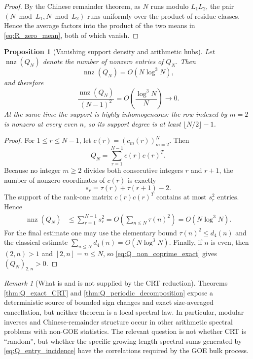 \documentclass[11pt]{amsart}
\numberwithin{equation}{section}
\theoremstyle{plain}
\newtheorem{proposition}[theorem]{Proposition}
\theoremstyle{definition}
\theoremstyle{remark}
\newtheorem{remark}[theorem]{Remark}
\begin{document}
\begin{proof}
By the Chinese remainder theorem, as $N$ runs modulo $L_1L_2$, the pair $(N\bmod L_1,N\bmod L_2)$ runs uniformly over the product of residue classes.  Hence the average factors into the product of the two means in \eqref{eq:R_zero_mean}, both of which vanish.
\end{proof}

\begin{proposition}[Vanishing support density and arithmetic hubs]
\label{prop:Q_sparsity}
Let $\operatorname{nnz}(Q_N)$ denote the number of nonzero entries of $Q_N$.  Then
\begin{equation}
\operatorname{nnz}(Q_N)=O(N\log^3N),
\label{eq:Q_nnz_bound}
\end{equation}
and therefore
\begin{equation}
\frac{\operatorname{nnz}(Q_N)}{(N-1)^2}
=O\!\left(\frac{\log^3N}{N}\right)\longrightarrow0.
\label{eq:Q_support_density_zero}
\end{equation}
At the same time the support is highly inhomogeneous: the row indexed by $m=2$ is nonzero at every even $n$, so its support degree is at least $\lfloor N/2\rfloor-1$.
\end{proposition}

\begin{proof}
For $1\le r\le N-1$, let $c(r)=(c_m(r))_{m=2}^N$.  Then
\begin{equation}
Q_N=\sum_{r=1}^{N-1}c(r)c(r)^T.
\label{eq:Q_rank_one_sum}
\end{equation}
Because no integer $m\ge2$ divides both consecutive integers $r$ and $r+1$, the number of nonzero coordinates of $c(r)$ is exactly
\begin{equation}
s_r=\tau(r)+\tau(r+1)-2.
\end{equation}
The support of the rank-one matrix $c(r)c(r)^T$ contains at most $s_r^2$ entries.  Hence
\begin{align}
\operatorname{nnz}(Q_N)
&\le\sum_{r=1}^{N-1}s_r^2
=O\!\left(\sum_{n\le N}\tau(n)^2\right)
=O(N\log^3N).
\end{align}
For the final estimate one may use the elementary bound $\tau(n)^2\le d_4(n)$ and the classical estimate $\sum_{n\le N}d_4(n)=O(N\log^3N)$.  Finally, if $n$ is even, then $(2,n)>1$ and $[2,n]=n\le N$, so \eqref{eq:Q_non_coprime_exact} gives $(Q_N)_{2,n}>0$.
\end{proof}

\begin{remark}[What is and is not supplied by the CRT reduction]
\label{rem:crt_not_goe}
Theorems \ref{thm:Q_exact_CRT} and \ref{thm:Q_periodic_decomposition} expose a deterministic source of bounded sign changes and exact size-averaged cancellation, but neither theorem is a local spectral law.  In particular, modular inverses and Chinese-remainder structure occur in other arithmetic spectral problems with non-GOE statistics.  The relevant question is not whether CRT is ``random'', but whether the specific growing-length spectral sums generated by \eqref{eq:Q_entry_incidence} have the correlations required by the GOE bulk process.
\end{remark}
\end{document}
